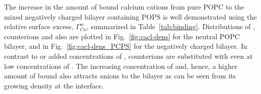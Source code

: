  





The increase in the amount of bound calcium cations from pure POPC to the mixed negatively charged bilayer containing POPS
is well demonstrated using the relative surface excess, $\Gamma ^w _{Ca}$,
summarized in Table~\ref{tab:binding}. 
Distributions of ,  counterions and also  
are plotted in Fig.~\ref{fig:cacl-dens} for the neutral POPC bilayer, 
and in Fig.~\ref{fig:cacl-dens_PCPS} for the negatively charged bilayer. 
In contrast to  or added concentrations of , 
 counterions are substituted with  even at low concentrations of . 
The increasing concentration of  and, hence, a higher amount of bound 
also attracts  anions to the bilayer 
as can be seen from its growing density at the interface. 


